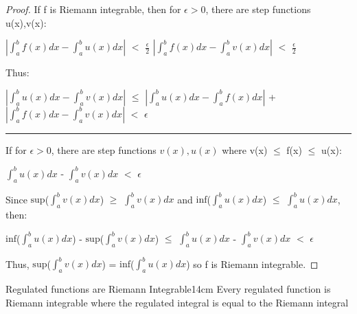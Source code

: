     \begin{proof}
        If f is Riemann integrable, then for $\epsilon > 0$,
        there are step functions u(x),v(x):

        \hspace{0.5cm}
        $|\int_a^b f(x) dx - \int_a^b u(x) dx|$ $<$ $\frac{\epsilon}{2}$
        \hspace{1cm}
        $|\int_a^b f(x) dx - \int_a^b v(x) dx|$ $<$ $\frac{\epsilon}{2}$

        Thus:

        \hspace{0.5cm}
        $|\int_a^b u(x) dx - \int_a^b v(x) dx|$
        $\leq$ $|\int_a^b u(x) dx - \int_a^b f(x) dx|$
                + $|\int_a^b f(x) dx - \int_a^b v(x) dx|$
        $<$ $\epsilon$

        \rule[0.1cm]{15.2cm}{0.01cm}

        If for $\epsilon > 0$, there are step functions $v(x),u(x)$
        where v(x) $\leq$ f(x) $\leq$ u(x):

        \hspace{0.5cm}
        $\int_a^b u(x) dx$ - $\int_a^b v(x) dx$ $<$ $\epsilon$

        Since
        $\text{sup}$($\int_a^b v(x) dx$)
        $\geq$ $\int_a^b v(x) dx$
        and
        $\text{inf}$($\int_a^b u(x) dx$)
        $\leq$ $\int_a^b u(x) dx$, then:

        \hspace{0.5cm}
        $\text{inf}$($\int_a^b u(x) dx$) - $\text{sup}$($\int_a^b v(x) dx$)
        $\leq$ $\int_a^b u(x) dx$ - $\int_a^b v(x) dx$ $<$ $\epsilon$

        Thus, $\text{sup}$($\int_a^b v(x) dx$)
        = $\text{inf}$($\int_a^b u(x) dx$)
        so f is Riemann integrable.
    \end{proof}

    \newpage



    \begin{wtheorem}{Regulated functions are Riemann Integrable}{14cm}
        Every regulated function is Riemann integrable where
        the regulated integral is equal to the Riemann integral
    \end{wtheorem}

